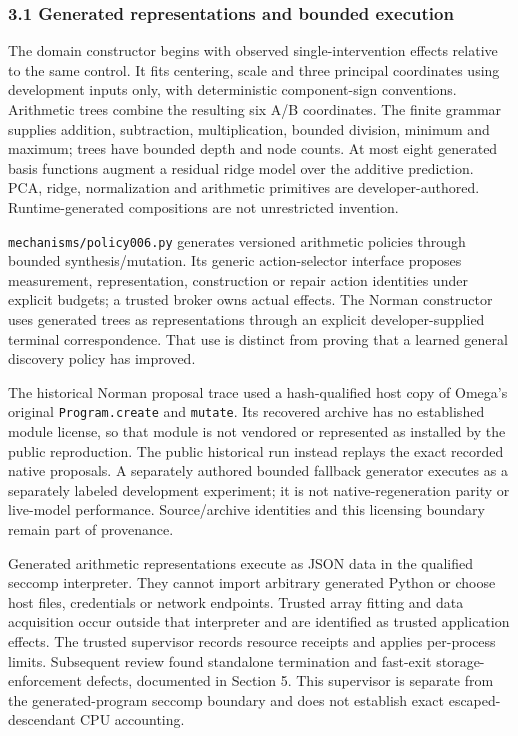 \documentclass[
  10pt,
]{article}
\begin{document}
\hypertarget{generated-representations-and-bounded-execution}{%
\subsubsection{3.1 Generated representations and bounded
execution}\label{generated-representations-and-bounded-execution}}

The domain constructor begins with observed single-intervention effects
relative to the same control. It fits centering, scale and three
principal coordinates using development inputs only, with deterministic
component-sign conventions. Arithmetic trees combine the resulting six
A/B coordinates. The finite grammar supplies addition, subtraction,
multiplication, bounded division, minimum and maximum; trees have
bounded depth and node counts. At most eight generated basis functions
augment a residual ridge model over the additive prediction. PCA, ridge,
normalization and arithmetic primitives are developer-authored.
Runtime-generated compositions are not unrestricted invention.

\texttt{mechanisms/policy006.py} generates versioned arithmetic policies
through bounded synthesis/mutation. Its generic action-selector
interface proposes measurement, representation, construction or repair
action identities under explicit budgets; a trusted broker owns actual
effects. The Norman constructor uses generated trees as representations
through an explicit developer-supplied terminal correspondence. That use
is distinct from proving that a learned general discovery policy has
improved.

The historical Norman proposal trace used a hash-qualified host copy of
Omega's original \texttt{Program.create} and \texttt{mutate}. Its
recovered archive has no established module license, so that module is
not vendored or represented as installed by the public reproduction. The
public historical run instead replays the exact recorded native
proposals. A separately authored bounded fallback generator executes as
a separately labeled development experiment; it is not
native-regeneration parity or live-model performance. Source/archive
identities and this licensing boundary remain part of provenance.

Generated arithmetic representations execute as JSON data in the
qualified seccomp interpreter. They cannot import arbitrary generated
Python or choose host files, credentials or network endpoints. Trusted
array fitting and data acquisition occur outside that interpreter and
are identified as trusted application effects. The trusted supervisor
records resource receipts and applies per-process limits. Subsequent
review found standalone termination and fast-exit storage-enforcement
defects, documented in Section 5. This supervisor is separate from the
generated-program seccomp boundary and does not establish exact
escaped-descendant CPU accounting.
\end{document}
